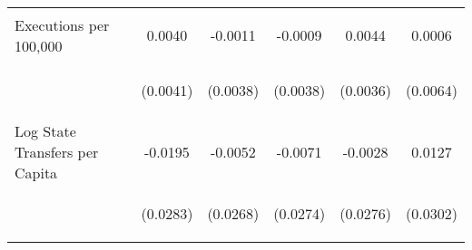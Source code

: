 \begin{center}
\begin{tabular}{lccccc}
\noalign{\smallskip}Executions per 100,000 & \begin{scriptsize}0.0040\end{scriptsize} & \begin{scriptsize}-0.0011\end{scriptsize} & \begin{scriptsize}-0.0009\end{scriptsize} & \begin{scriptsize}0.0044\end{scriptsize} & \begin{scriptsize}0.0006\end{scriptsize}\\
 & \begin{scriptsize}(0.0041)\end{scriptsize} & \begin{scriptsize}(0.0038)\end{scriptsize} & \begin{scriptsize}(0.0038)\end{scriptsize} & \begin{scriptsize}(0.0036)\end{scriptsize} & \begin{scriptsize}(0.0064)\end{scriptsize}\\
\noalign{\smallskip}Log State Transfers per Capita & \begin{scriptsize}-0.0195\end{scriptsize} & \begin{scriptsize}-0.0052\end{scriptsize} & \begin{scriptsize}-0.0071\end{scriptsize} & \begin{scriptsize}-0.0028\end{scriptsize} & \begin{scriptsize}0.0127\end{scriptsize}\\
 & \begin{scriptsize}(0.0283)\end{scriptsize} & \begin{scriptsize}(0.0268)\end{scriptsize} & \begin{scriptsize}(0.0274)\end{scriptsize} & \begin{scriptsize}(0.0276)\end{scriptsize} & \begin{scriptsize}(0.0302)\end{scriptsize}\\

\end{tabular}
\end{center}
